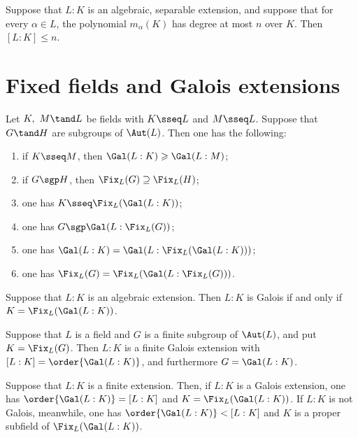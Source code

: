 \documentclass{article}
\begin{document}
  \begin{tcorollary}
    Suppose that $L:K$ is an algebraic, separable extension, and suppose that for every $\alpha\in L$, the polynomial $m_\alpha(K)$ has degree at most $n$ over $K$. Then $[L:K]\leq n$.
  \end{tcorollary}

\section{Fixed fields and Galois extensions}
  \begin{tproposition}
    Let $K,\ M \tand L$ be fields with $K\sseq L$ and $M\sseq L$. Suppose that $G\tand H$ are subgroups of $\Aut(L)$. Then one has the following:
    \begin{enumerate}[label=(\alph*)]
      \item if $K\sseq M$, then $\Gal(L:K) \geqslant \Gal(L:M)$;
      \item if $G\sgp H$, then $\Fix_L(G)\supseteq \Fix_L(H)$;
      \item one has $K\sseq \Fix_L(\Gal(L:K))$;
      \item one has $G\sgp\Gal(L:\Fix_L(G))$;
      \item one has $\Gal(L:K) = \Gal(L:\Fix_L(\Gal(L:K)))$;
      \item one has $\Fix_L(G) = \Fix_L(\Gal(L:\Fix_L(G)))$.
    \end{enumerate}
  \end{tproposition}

  \begin{ttheorem}
    Suppose that $L:K$ is an algebraic extension. Then $L:K$ is Galois if and only if $K=\Fix_L(\Gal(L:K))$.
  \end{ttheorem}

  \begin{ttheorem}
    Suppose that $L$ is a field and $G$ is a finite subgroup of $\Aut(L)$, and put $K=\Fix_L(G)$. Then $L:K$ is a finite Galois extension with $[L:K]=\order{\Gal(L:K)}$, and furthermore $G=\Gal(L:K)$.
  \end{ttheorem}

  \begin{ttheorem}
    Suppose that $L:K$ is a finite extension. Then, if $L:K$ is a Galois extension, one has $\order{\Gal(L:K)}=[L:K]$ and $K=\Fix_L(\Gal(L:K))$. If $L:K$ is not Galois, meanwhile, one has $\order{\Gal(L:K)}<[L:K]$ and $K$ is a proper subfield of $\Fix_L(\Gal(L:K))$.
  \end{ttheorem}
\end{document}
